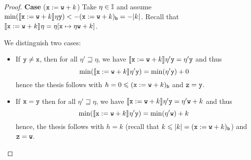 \begin{proof}
  
  \medskip
  
  \noindent
  \textbf{Case} (\(\var := \var[w] + k\))
  Take \(\eta \in \inte\) and assume
  \(\min(\semi{\var := \var[w] + k}\eta \var[y]) < -\lbound{\var :=
    \var[w] + k} = - |k|\).
  Recall that
  \(\semi{\var := \var[w] + k}\eta = \eta[\var \mapsto \eta \var[w] + k]\).
  
  We distinguish two cases:
  \begin{itemize}
    
  \item If \(\var[y] \neq \var\), then for all \(\eta' \sqsupseteq \eta\), we have
    \(\semi{\var := \var[w] + k}\eta' \var[y] = \eta' \var[y]\) and thus
    \begin{equation*}
      \min(\semi{\var := \var[w] + k}\eta' \var[y]) = \min(\eta' \var[y]) + 0
    \end{equation*}
    hence the thesis follows with
    \(h =0 \leq \lbound{\var := \var[w] + k}\) and \(\var[z] = \var[y]\).
    
  \item 
    If \(\var = \var[y]\) then  for all \(\eta' \sqsupseteq \eta\), we have
    \(\semi{\var := \var[w] + k}\eta' \var[y] = \eta' \var[w] +
    k\) and thus
    \begin{equation*}
      \min(\semi{\var := \var[w] + k}\eta' \var[y]) = \min(\eta' \var[w]) +
      k
    \end{equation*}
    hence, the thesis follows with \(h = k\) (recall that
    \(k \leq |k| = \lbound{\var := \var[w] + k}\)) and
    \(\var[z] = \var[w]\).
  \end{itemize}

  
  
  
    
    

\end{proof}
